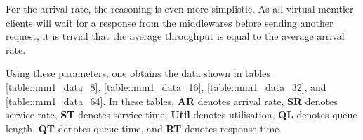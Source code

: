 \documentclass[11pt,a4paper]{article}
\begin{document}
For the arrival rate, the reasoning is even more simplistic. As all virtual memtier clients will wait for a response from the middlewares before sending another request, it is trivial that the average throughput is equal to the average arrival rate.

Using these parameters, one obtains the data shown in tables \ref{table::mm1_data_8}, \ref{table::mm1_data_16}, \ref{table::mm1_data_32}, and \ref{table::mm1_data_64}. In these tables, \textbf{AR} denotes arrival rate, \textbf{SR} denotes service rate, \textbf{ST} denotes service time, \textbf{Util} denotes utilisation, \textbf{QL} denotes queue length, \textbf{QT} denotes queue time, and \textbf{RT} denotes response time.

\begin{table}
    \centering
    \caption{Data for M/M/1 queuing model for 8 worker configuration}
    \label{table::mm1_data_8}
\end{table}
\end{document}
